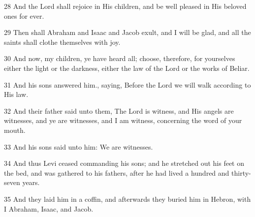 \par 28 And the Lord shall rejoice in His children, and be well pleased in His beloved ones for ever.

\par 29 Then shall Abraham and Isaac and Jacob exult, and I will be glad, and all the saints shall clothe themselves with joy.

\par 30 And now, my children, ye have heard all; choose, therefore, for yourselves either the light or the darkness, either the law of the Lord or the works of Beliar.

\par 31 And his sons answered him., saying, Before the Lord we will walk according to His law.

\par 32 And their father said unto them, The Lord is witness, and His angels are witnesses, and ye are witnesses, and I am witness, concerning the word of your mouth.

\par 33 And his sons said unto him: We are witnesses.

\par 34 And thus Levi ceased commanding his sons; and he stretched out his feet on the bed, and was gathered to his fathers, after he had lived a hundred and thirty-seven years.

\par 35 And they laid him in a coffin, and afterwards they buried him in Hebron, with I Abraham, Isaac, and Jacob.


